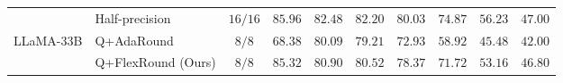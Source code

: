 \documentclass{article}
\theoremstyle{plain}
\theoremstyle{definition}
\theoremstyle{remark}
\begin{document}
\begin{table}[h]
\begin{center}
{\begin{tabular}{clcccccccc}
\midrule
& Half-precision & $16 / 16$ & $85.96$ & $82.48$ & $82.20$ & $80.03$ & $74.87$ & $56.23$ & $47.00$ \\
\cmidrule{2-10}
LLaMA-$33$B& Q+AdaRound  & $8 / 8$ & $68.38$ & $80.09$ & $79.21$ & $72.93$ & $58.92$ & $45.48$ & $42.00$ \\
& Q+FlexRound (Ours) & $8 / 8$ & $\mathbf{85.32}$ & $\mathbf{80.90}$ & $\mathbf{80.52}$ & $\mathbf{78.37}$ & $\mathbf{71.72}$ & $\mathbf{53.16}$ & $\mathbf{46.80}$ \\
\bottomrule
\end{tabular}
}
\end{center}
\end{table}

\clearpage
\end{document}
